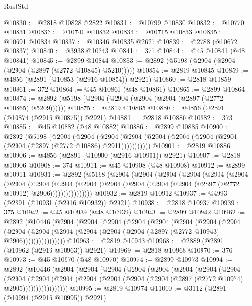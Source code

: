 \begin{lexlean}{RustStd}
\begin{coremodule}
@10830 := @2818 @10828 @2822
@10831 := @10799 @10830
@10832 := @10770 @10831
@10833 := @10740 @10832
@10834 := @10715 @10833
@10835 := @10691 @10834
@10837 := @10346 @10835 @2621
@10839 := @2788 (@10672 @10837)
@10840 := @3938 @10343
@10841 := 371
@10844 := @45 @10841 (@48 @10841)
@10845 := @2899 @10844
@10853 := @2892 (@5198 (@2904 (@2904 (@2904 (@2897 (@2772 @10845) @5210)))))
@10854 := @2819 @10845
@10859 := @4856 (@2891 (@10853 (@2916 @10854)) @2921)
@10860 := @2818 @10859
@10861 := 372
@10864 := @45 @10861 (@48 @10861)
@10865 := @2899 @10864
@10874 := @2892 (@5198 (@2904 (@2904 (@2904 (@2904 (@2897 (@2772 @10865) @5209))))))
@10875 := @2819 @10865
@10880 := @4856 (@2891 (@10874 (@2916 @10875)) @2921)
@10881 := @2818 @10880
@10882 := 373
@10885 := @45 @10882 (@48 @10882)
@10886 := @2899 @10885
@10900 := @2892
    (@5198
      (@2904
        (@2904
          (@2904 (@2904 (@2904 (@2904 (@2904 (@2904 (@2904 (@2897 (@2772 @10886) @2911)))))))))))
@10901 := @2819 @10886
@10906 := @4856 (@2891 (@10900 (@2916 @10901)) @2921)
@10907 := @2818 @10906
@10908 := 374
@10911 := @45 @10908 (@48 @10908)
@10912 := @2899 @10911
@10931 := @2892
    (@5198
      (@2904
        (@2904
          (@2904
            (@2904
              (@2904
                (@2904
                  (@2904
                    (@2904
                      (@2904
                        (@2904
                          (@2904 (@2904 (@2904 (@2904 (@2897 (@2772 @10912) @2906))))))))))))))))
@10932 := @2819 @10912
@10937 := @4993 (@2891 (@10931 (@2916 @10932)) @2921)
@10938 := @2818 @10937
@10939 := 375
@10942 := @45 @10939 (@48 @10939)
@10943 := @2899 @10942
@10962 := @2892
    (@10446
      (@2904
        (@2904
          (@2904
            (@2904
              (@2904
                (@2904
                  (@2904
                    (@2904
                      (@2904
                        (@2904
                          (@2904 (@2904 (@2904 (@2904 (@2897 (@2772 @10943) @2906))))))))))))))))
@10963 := @2819 @10943
@10968 := @2889 (@2891 (@10962 (@2916 @10963)) @2921)
@10969 := @2818 @10968
@10970 := 376
@10973 := @45 @10970 (@48 @10970)
@10974 := @2899 @10973
@10994 := @2892
    (@10446
      (@2904
        (@2904
          (@2904
            (@2904
              (@2904
                (@2904
                  (@2904
                    (@2904
                      (@2904
                        (@2904
                          (@2904
                            (@2904 (@2904 (@2904 (@2904 (@2897 (@2772 @10974) @2905)))))))))))))))))
@10995 := @2819 @10974
@11000 := @3112 (@2891 (@10994 (@2916 @10995)) @2921)

\end{coremodule}
\end{lexlean}
